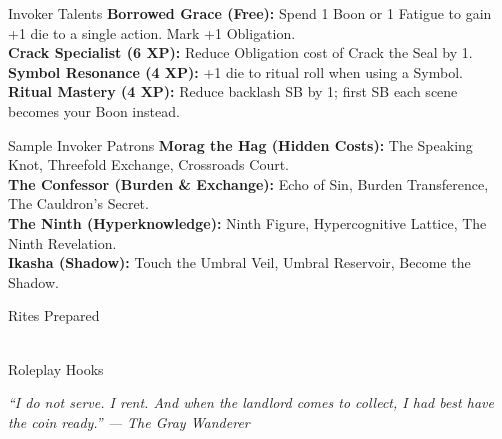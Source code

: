 \documentclass[10pt]{article}
\begin{document}
\hfill
\begin{minipage}[t]{0.48\linewidth}
    \begin{charbox}{Invoker Talents}
        \textbf{Borrowed Grace (Free):} Spend 1 Boon or 1 Fatigue to gain +1 die to a single action. Mark +1 Obligation.\\
        \textbf{Crack Specialist (6 XP):} Reduce Obligation cost of Crack the Seal by 1.\\
        \textbf{Symbol Resonance (4 XP):} +1 die to ritual roll when using a Symbol.\\
        \textbf{Ritual Mastery (4 XP):} Reduce backlash SB by 1; first SB each scene becomes your Boon instead.
    \end{charbox}
    
    \vspace{0.5em}
    
    \begin{charbox}{Sample Invoker Patrons}
        \textbf{Morag the Hag (Hidden Costs):} The Speaking Knot, Threefold Exchange, Crossroads Court.\\
        \textbf{The Confessor (Burden \& Exchange):} Echo of Sin, Burden Transference, The Cauldron's Secret.\\
        \textbf{The Ninth (Hyperknowledge):} Ninth Figure, Hypercognitive Lattice, The Ninth Revelation.\\
        \textbf{Ikasha (Shadow):} Touch the Umbral Veil, Umbral Reservoir, Become the Shadow.
    \end{charbox}
    
    \vspace{0.5em}
    
    \begin{charbox}{Rites Prepared}
        \underline{\hspace{7cm}}\\
        \underline{\hspace{7cm}}\\
        \underline{\hspace{7cm}}
    \end{charbox}
    
    \vspace{0.5em}
    
    \begin{charbox}{Roleplay Hooks}
        \underline{\hspace{7cm}}\\
        \underline{\hspace{7cm}}
    \end{charbox}
\end{minipage}

\vspace{1em}
\begin{center}
    {\small\sffamily\itshape ``I do not serve. I rent. And when the landlord comes to collect, I had best have the coin ready.'' --- The Gray Wanderer}
\end{center}
\end{document}
